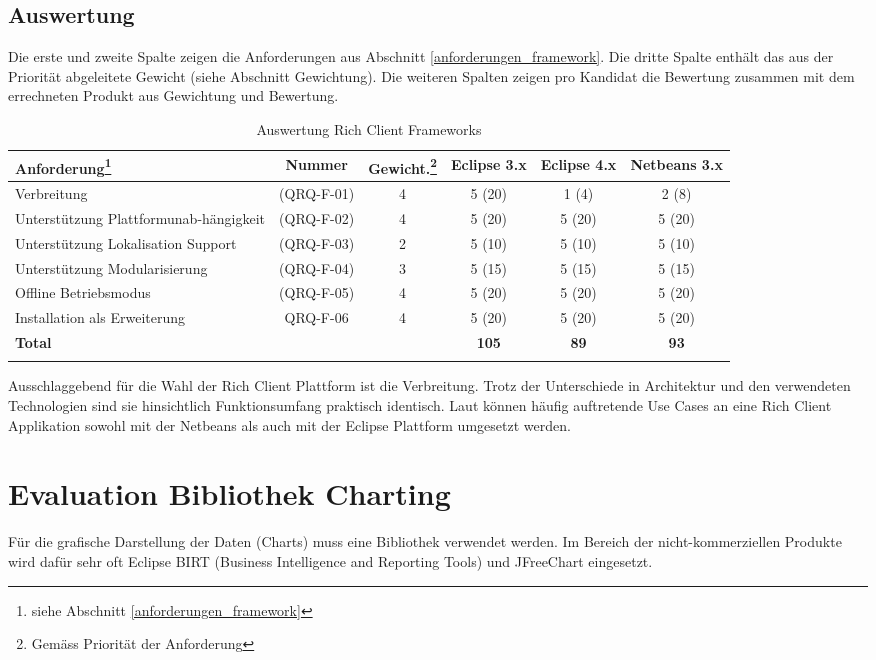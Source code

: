 \subsection{Auswertung}
Die erste und zweite Spalte zeigen die Anforderungen aus Abschnitt \ref{anforderungen_framework}. Die dritte Spalte enthält das aus der Priorität abgeleitete Gewicht (siehe Abschnitt Gewichtung). Die weiteren Spalten zeigen pro Kandidat die Bewertung zusammen mit dem errechneten Produkt aus Gewichtung und Bewertung.
\begin{longtable}{|p{3cm}|c|c|c|c|c|}\hline
 \textbf{Anforderung\footnote{siehe Abschnitt \ref{anforderungen_framework}}} & \textbf{Nummer} &  \textbf{Gewicht.\footnote{Gemäss Priorität der Anforderung}} & \textbf{Eclipse 3.x} & \textbf{Eclipse 4.x} &  \textbf{Netbeans 3.x}\\\hline
   Verbreitung & (QRQ-F-01) & 4 & 5 (20) & 1 (4) & 2 (8)\\\hline
   Unterstützung Plattformunab-hängigkeit & (QRQ-F-02) & 4 & 5 (20) & 5 (20) & 5 (20)\\\hline
   Unterstützung Lokalisation Support & (QRQ-F-03) & 2 & 5 (10) & 5 (10) & 5 (10) \\\hline
   Unterstützung Modularisierung & (QRQ-F-04) & 3 & 5 (15) & 5 (15) & 5 (15) \\\hline
   Offline Betriebsmodus & (QRQ-F-05) & 4 & 5 (20) & 5 (20) & 5 (20) \\\hline
   Installation als Erweiterung & QRQ-F-06 & 4 & 5 (20) & 5 (20) & 5 (20) \\\hline
   \textbf{Total} & & & \textbf{105} & \textbf{89} & \textbf{93}\\\hline
    \caption{Auswertung Rich Client Frameworks}
\end{longtable}

Ausschlaggebend für die Wahl der Rich Client Plattform ist die Verbreitung. Trotz der Unterschiede in Architektur und den verwendeten Technologien sind sie hinsichtlich Funktionsumfang praktisch identisch. Laut \cite{toedter20071120} können häufig auftretende Use Cases an eine Rich Client Applikation sowohl mit der Netbeans als auch mit der Eclipse Plattform umgesetzt werden.


\section{Evaluation Bibliothek Charting}
Für die grafische Darstellung der Daten (Charts) muss eine Bibliothek verwendet werden. Im Bereich der nicht-kommerziellen Produkte wird dafür sehr oft Eclipse BIRT (Business Intelligence and Reporting Tools) und JFreeChart eingesetzt.
